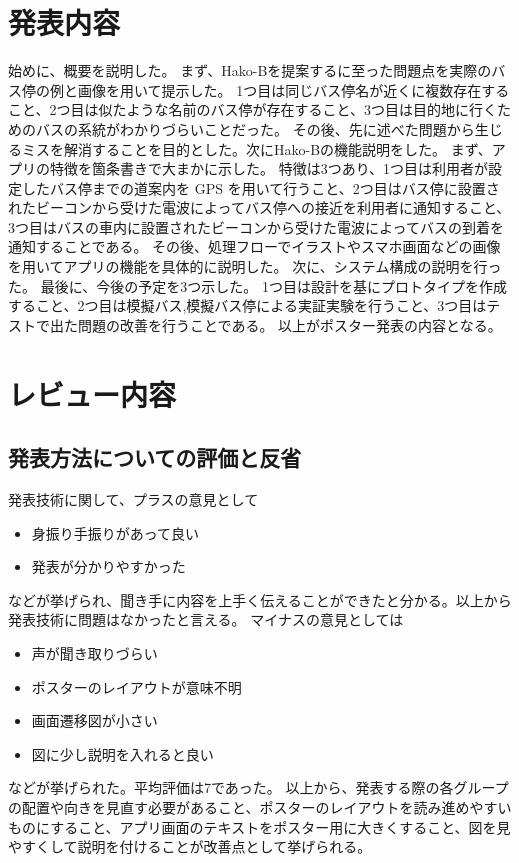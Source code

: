 \documentclass[openany,11pt,papersize]{jsbook}
\begin{document}
\section{発表内容}
始めに、概要を説明した。
まず、Hako-Bを提案するに至った問題点を実際のバス停の例と画像を用いて提示した。
1つ目は同じバス停名が近くに複数存在すること、2つ目は似たような名前のバス停が存在すること、3つ目は目的地に行くためのバスの系統がわかりづらいことだった。
その後、先に述べた問題から生じるミスを解消することを目的とした。次にHako-Bの機能説明をした。
まず、アプリの特徴を箇条書きで大まかに示した。
特徴は3つあり、1つ目は利用者が設定したバス停までの道案内を GPS を用いて行うこと、2つ目はバス停に設置されたビーコンから受けた電波によってバス停への接近を利用者に通知すること、3つ目はバスの車内に設置されたビーコンから受けた電波によってバスの到着を通知することである。
その後、処理フローでイラストやスマホ画面などの画像を用いてアプリの機能を具体的に説明した。
次に、システム構成の説明を行った。
最後に、今後の予定を3つ示した。
1つ目は設計を基にプロトタイプを作成すること、2つ目は模擬バス,模擬バス停による実証実験を行うこと、3つ目はテストで出た問題の改善を行うことである。
以上がポスター発表の内容となる。


\section{レビュー内容}

\subsection{発表方法についての評価と反省}
発表技術に関して、プラスの意見として
\begin{itemize}

\item 身振り手振りがあって良い
\item 発表が分かりやすかった

\end{itemize}
などが挙げられ、聞き手に内容を上手く伝えることができたと分かる。以上から発表技術に問題はなかったと言える。
マイナスの意見としては
\begin{itemize}

\item 声が聞き取りづらい
\item ポスターのレイアウトが意味不明
\item 画面遷移図が小さい
\item 図に少し説明を入れると良い

\end{itemize}
などが挙げられた。平均評価は7であった。
以上から、発表する際の各グループの配置や向きを見直す必要があること、ポスターのレイアウトを読み進めやすいものにすること、アプリ画面のテキストをポスター用に大きくすること、図を見やすくして説明を付けることが改善点として挙げられる。
\end{document}

